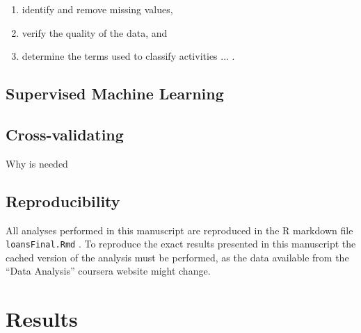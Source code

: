 \documentclass[a4paper,12pt]{extarticle}
\begin{document}
\begin{enumerate}
  \item identify and remove missing values,
  \item verify the quality of the data, and
  \item determine the terms used to classify activities ... .
\end{enumerate}

\subsection{Supervised Machine Learning}


\subsection{Cross-validating}

Why is needed

\subsection{Reproducibility}

All analyses performed in this manuscript are reproduced in the R markdown file \texttt{loansFinal.Rmd} \cite{source:r-markdown}. To reproduce the exact results presented in this manuscript the cached version of the analysis must be performed, as the data available from the ``Data Analysis'' coursera website might change.


\section{Results}


\end{document}
